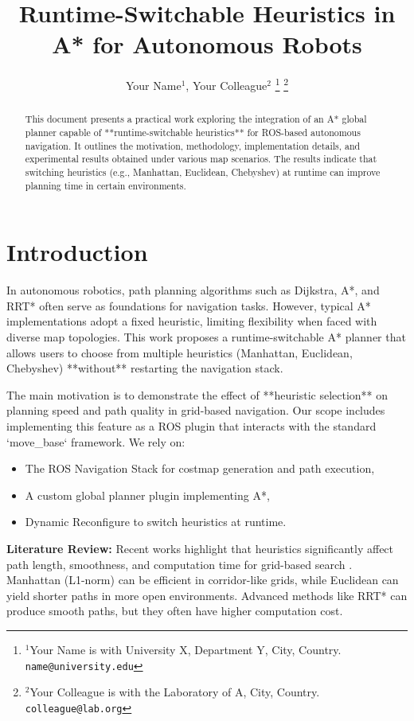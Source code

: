 \documentclass[letterpaper, 10 pt, conference]{ieeeconf}
\title{\LARGE\bf 
Runtime-Switchable Heuristics in A* for Autonomous Robots
}
\author{
\centering
Your Name$^{1}$, Your Colleague$^{2}$%
\thanks{$^{1}$Your Name is with University X, Department Y, City, Country.
        {\tt\small name@university.edu}}%
\thanks{$^{2}$Your Colleague is with the Laboratory of A, City, Country.
        {\tt\small colleague@lab.org}}%
}
\begin{document}
\maketitle

\begin{abstract}
This document presents a practical work exploring the integration of an A* global planner 
capable of **runtime-switchable heuristics** for ROS-based autonomous navigation. 
It outlines the motivation, methodology, implementation details, and experimental 
results obtained under various map scenarios. The results indicate that switching 
heuristics (e.g., Manhattan, Euclidean, Chebyshev) at runtime can improve planning 
time in certain environments. 
\end{abstract}


\section{Introduction}\label{sec:intro}
In autonomous robotics, path planning algorithms such as Dijkstra, A*, and RRT* 
often serve as foundations for navigation tasks. However, typical A* implementations 
adopt a fixed heuristic, limiting flexibility when faced with diverse map topologies. 
This work proposes a run\-time-switchable A* planner that allows users to choose from 
multiple heuristics (Manhattan, Euclidean, Chebyshev) **without** restarting the 
navigation stack.

The main motivation is to demonstrate the effect of **heuristic selection** on planning 
speed and path quality in grid-based navigation. Our scope includes implementing this 
feature as a ROS plugin that interacts with the standard `move_base` framework. 
We rely on:
\begin{itemize}
    \item The ROS Navigation Stack for costmap generation and path execution,
    \item A custom global planner plugin implementing A*,
    \item Dynamic Reconfigure to switch heuristics at runtime.
\end{itemize}

\textbf{Literature Review:}
Recent works highlight that heuristics significantly affect path length, smoothness, 
and computation time for grid-based search \cite{thrun2005probabilistic, lavalle2006planning}. 
Manhattan (L1-norm) can be efficient in corridor-like grids, while Euclidean can yield 
shorter paths in more open environments. Advanced methods like RRT* 
\cite{karaman2011sampling} can produce smooth paths, but they often have higher 
computation cost. 
\end{document}
